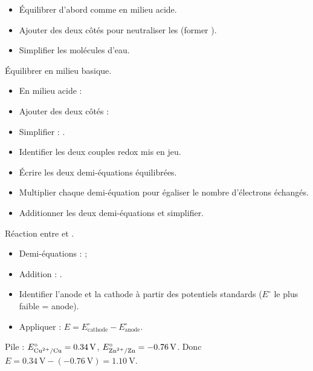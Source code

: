 \begin{itemize}
    \item Équilibrer d'abord comme en milieu acide.
    \item Ajouter  des deux côtés pour neutraliser les  (former ).
    \item Simplifier les molécules d'eau.
\end{itemize}
\begin{exemple}
Équilibrer  en milieu basique.
\begin{itemize}
    \item En milieu acide : 
    \item Ajouter  des deux côtés : 
    \item Simplifier  : .
\end{itemize}
\end{exemple}

\begin{itemize}
    \item Identifier les deux couples redox mis en jeu.
    \item Écrire les deux demi-équations équilibrées.
    \item Multiplier chaque demi-équation pour égaliser le nombre d'électrons échangés.
    \item Additionner les deux demi-équations et simplifier.
\end{itemize}
\begin{exemple}
Réaction entre  et .
\begin{itemize}
    \item Demi-équations :  ; 
    \item Addition : .
\end{itemize}
\end{exemple}

\begin{itemize}
    \item Identifier l'anode et la cathode à partir des potentiels standards ($E^\circ$ le plus faible = anode).
    \item Appliquer : $E = E^\circ_{\text{cathode}} - E^\circ_{\text{anode}}$.
\end{itemize}
\begin{exemple}
Pile  : $E^\circ_{\ce{Cu^2+/Cu}} = \SI{0.34}{\volt}$, $E^\circ_{\ce{Zn^2+/Zn}} = \SI{-0.76}{\volt}$. Donc $E = \SI{0.34}{\volt} - (\SI{-0.76}{\volt}) = \SI{1.10}{\volt}$.
\end{exemple}

